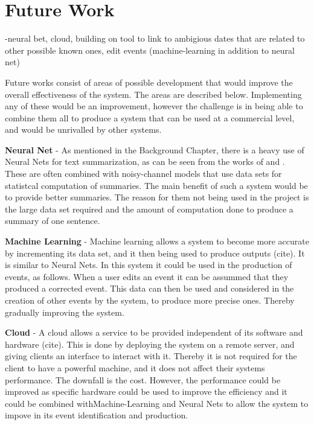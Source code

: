 \section{Future Work}
-neural bet, cloud, building on tool to link to ambigious dates that are related to other possible known ones, edit events (machine-learning in addition to neural net)
\par Future works consist of areas of possible development that would improve the overall effectiveness of the system. The areas are described below. Implementing any of these would be an improvement, however the challenge is in being able to combine them all to produce a system that can be used at a commercial level, and would be unrivalled by other systems.
\par \textbf{Neural Net} - As mentioned in the Background Chapter, there is a heavy use of Neural Nets for text summarization, as can be seen from the works of \cite{chopraaulirush2016} and \cite{rushchopraweston2015}. These are often combined with noisy-channel models that use data sets for statistcal computation of summaries. The main benefit of such a system would be to provide better summaries. The reason for them not being used in the project is the large data set required and the amount of computation done to produce a summary of one sentence.
\par \textbf{Machine Learning} - Machine learning allows a system to become more accurate by incrementing its data set, and it then being used to produce outputs (cite). It is similar to Neural Nets. In this system it could be used in the production of events, as follows. When a user edits an event it can be assummed that they produced a corrected event. This data can then be used and considered in the creation of other events by the system, to produce more precise ones. Thereby gradually improving the system.
\par \textbf{Cloud} - A cloud allows a service to be provided independent of its software and hardware (cite). This is done by deploying the system on a remote server, and giving clients an interface to interact with it. Thereby it is not required for the client to have a powerful machine, and it does not affect their systems performance. The downfall is the cost. However, the performance could be improved as specific hardware could be used to improve the efficiency and it could be combined withMachine-Learning and Neural Nets to allow the system to impove in its event identification and production.
